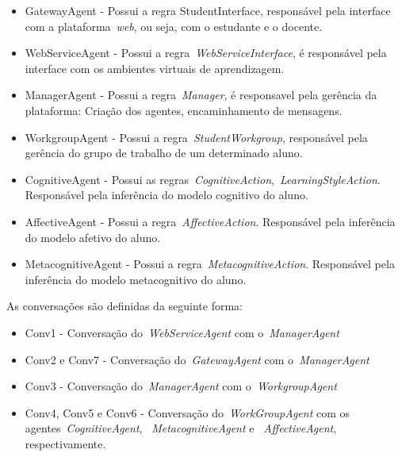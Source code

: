 \begin{itemize}
	\item GatewayAgent - Possui a regra StudentInterface, responsável pela interface com a plataforma~\emph{web}, ou seja, com o estudante e o docente.
	\item WebServiceAgent - Possui a regra~\emph{WebServiceInterface}, é responsável pela interface com os ambientes virtuais de aprendizagem.
	\item ManagerAgent - Possui a regra~\emph{Manager}, é responsavel pela gerência da plataforma: Criação dos agentes, encaminhamento de mensagens.
	\item WorkgroupAgent - Possui a regra~\emph{StudentWorkgroup}, responsável pela gerência do grupo de trabalho de um determinado aluno.
	\item CognitiveAgent - Possui as regras~\emph{CognitiveAction},~\emph{LearningStyleAction}. Responsável pela inferência do modelo cognitivo do aluno.
	\item AffectiveAgent - Possui a regra~\emph{AffectiveAction}. Responsável pela inferência do modelo afetivo do aluno.
	\item MetacognitiveAgent - Possui a regra~\emph{MetacognitiveAction}. Responsável pela inferência do modelo metacognitivo do aluno.
\end{itemize}

As conversações são definidas da seguinte forma:
\begin{itemize}
	\item Conv1 - Conversação do~\emph{WebServiceAgent} com o~\emph{ManagerAgent}
	\item Conv2 e Conv7 - Conversação do~\emph{GatewayAgent} com o~\emph{ManagerAgent}
	\item Conv3 - Conversação do~\emph{ManagerAgent} com o~\emph{WorkgroupAgent}
	\item Conv4, Conv5 e Conv6 - Conversação do~\emph{WorkGroupAgent} com os agentes~\emph{CognitiveAgent}, ~\emph{MetacognitiveAgent} e ~\emph{AffectiveAgent}, respectivamente.
\end{itemize}

